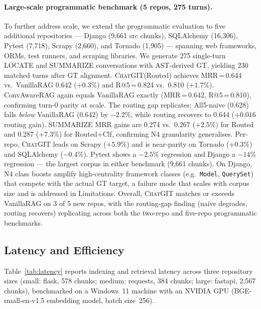 \documentclass[runningheads]{llncs}
\newcommand{\chatgit}{\textsc{ChatGIT}\xspace}
\begin{document}
\paragraph{Large-scale programmatic benchmark (5 repos, 275 turns).}
To further address scale, we extend the programmatic evaluation to five
additional repositories --- Django (9,661 src chunks), SQLAlchemy (16,306),
Pytest (7,718), Scrapy (2,660), and Tornado (1,905) --- spanning web
frameworks, ORMs, test runners, and scraping libraries. We generate 275
single-turn LOCATE and SUMMARIZE conversations with AST-derived GT,
yielding 230 matched turns after GT alignment.
\chatgit (Routed) achieves MRR\,=\,0.644 vs.\ VanillaRAG 0.642
($+0.3\%$) and R@5\,=\,0.824 vs.\ 0.810 ($+1.7\%$).
ConvAwareRAG again equals VanillaRAG exactly (MRR\,=\,0.642, R@5\,=\,0.810),
confirming turn-0 parity at scale. The routing gap replicates:
All5-naive (0.628) falls \emph{below} VanillaRAG (0.642) by $-2.2\%$,
while routing recovers to 0.644 ($+0.016$ routing gain).
SUMMARIZE MRR gains are 0.274 vs.\ 0.267 ($+2.5\%$) for Routed and
0.287 ($+7.3\%$) for Routed+Clf, confirming N4 granularity generalises.
Per-repo, \chatgit leads on Scrapy ($+5.9\%$) and is near-parity on
Tornado ($+0.3\%$) and SQLAlchemy ($-0.4\%$). Pytest shows a $-2.5\%$
regression and Django a $-14\%$ regression --- the largest corpus in
either benchmark (9,661 chunks). On Django, N4 class boosts amplify
high-centrality framework classes (e.g.\ \texttt{Model},
\texttt{QuerySet}) that compete with the actual GT target, a failure
mode that scales with corpus size and is addressed in Limitations.
Overall, \chatgit matches or exceeds VanillaRAG on 3 of 5 new repos,
with the routing-gap finding (naive degrades, routing recovers)
replicating across both the two-repo and five-repo programmatic benchmarks.

\subsection{Latency and Efficiency}
\label{sec:latency}

Table~\ref{tab:latency} reports indexing and retrieval latency
across three repository sizes (small: flask, 578 chunks; medium:
requests, 384 chunks; large: fastapi, 2{,}567 chunks),
benchmarked on a Windows~11 machine with an NVIDIA GPU
(BGE-small-en-v1.5 embedding model, batch size~256).
\end{document}
